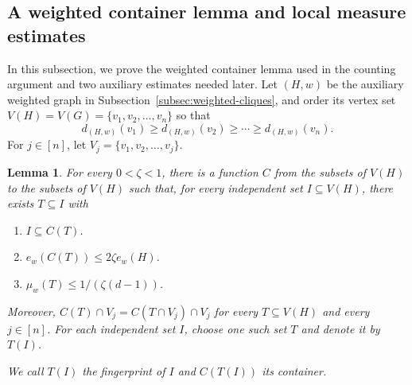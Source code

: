 \documentclass[12pt]{article}
\numberwithin{equation}{section}
\newtheorem{lemma}[theorem]{Lemma}
\theoremstyle{definition}
\begin{document}
\subsection{A weighted container lemma and local measure estimates}

In this subsection, we prove the weighted container lemma used in the counting
argument and two auxiliary estimates needed later.
Let $(H,w)$ be the auxiliary weighted graph in Subsection~\ref{subsec:weighted-cliques},
and order its vertex set $V(H)=V(G)=\{v_1,v_2,\ldots,v_n\}$ so that
\[
 d_{(H,w)}(v_1)\geq d_{(H,w)}(v_2)\geq\cdots\geq d_{(H,w)}(v_n).
\]
For $j\in[n]$, let $V_j=\{v_1,v_2,\ldots,v_j\}$.

\begin{lemma}\label{lem:online-container}
For every $0<\zeta<1$, there is a function $C$ from the subsets of $V(H)$ to
the subsets of $V(H)$ such that, for every independent set $I\subseteq V(H)$,
there exists $T\subseteq I$ with
\begin{enumerate}[label=(C\arabic*),ref=(C\arabic*),labelindent=2em,
	leftmargin=*]
\item\label{cond:cover} $I\subseteq C(T)$.
\item\label{cond:edges} $e_w(C(T)) \leq 2\zeta e_w(H)$.
\item\label{cond:measure} $\mu_w(T) \leq 1/(\zeta(d-1))$.
\end{enumerate}
Moreover, $C(T)\cap V_j=C(T\cap V_j)\cap V_j$ for every
$T\subseteq V(H)$ and every $j\in[n]$.
For each independent set $I$, choose one such set $T$ and denote it by
$T(I)$. 

We call $T(I)$ the fingerprint of $I$ and $C(T(I))$ its container.
\end{lemma}
\end{document}
